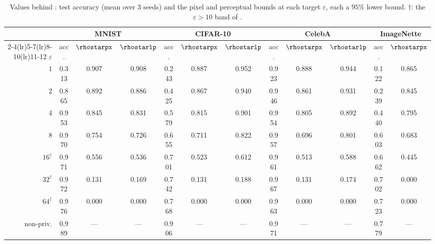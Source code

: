 \begin{table}[htbp]\centering\footnotesize\setlength{\tabcolsep}{3pt}
\begin{tabular}{r ccc ccc ccc cc}
\toprule
 & \multicolumn{3}{c}{MNIST} & \multicolumn{3}{c}{CIFAR-10} & \multicolumn{3}{c}{CelebA} & \multicolumn{2}{c}{ImageNette} \\
\cmidrule(lr){2-4}\cmidrule(lr){5-7}\cmidrule(lr){8-10}\cmidrule(lr){11-12}
$\varepsilon$ & acc. & $\rhostarpx$ & $\rhostarlp$ & acc. & $\rhostarpx$ & $\rhostarlp$ & acc. & $\rhostarpx$ & $\rhostarlp$ & acc. & $\rhostarpx$ \\
\midrule
$1$ & 0.313 & 0.907 & 0.908 & 0.243 & 0.887 & 0.952 & 0.923 & 0.888 & 0.944 & 0.122 & 0.865 \\
$2$ & 0.865 & 0.892 & 0.886 & 0.425 & 0.867 & 0.940 & 0.946 & 0.861 & 0.931 & 0.239 & 0.845 \\
$4$ & 0.953 & 0.845 & 0.831 & 0.579 & 0.815 & 0.901 & 0.954 & 0.805 & 0.892 & 0.440 & 0.795 \\
$8$ & 0.970 & 0.754 & 0.726 & 0.655 & 0.711 & 0.822 & 0.957 & 0.696 & 0.801 & 0.603 & 0.683 \\
$16^{\dagger}$ & 0.971 & 0.556 & 0.536 & 0.701 & 0.523 & 0.612 & 0.961 & 0.513 & 0.588 & 0.662 & 0.445 \\
$32^{\dagger}$ & 0.972 & 0.131 & 0.169 & 0.742 & 0.131 & 0.188 & 0.967 & 0.131 & 0.174 & 0.702 & 0.000 \\
$64^{\dagger}$ & 0.976 & 0.000 & 0.000 & 0.768 & 0.000 & 0.000 & 0.963 & 0.000 & 0.000 & 0.723 & 0.000 \\
\midrule
non-priv. & 0.989 & --- & --- & 0.906 & --- & --- & 0.971 & --- & --- & 0.779 & --- \\
\bottomrule
\end{tabular}
\caption{Values behind : test accuracy (mean over 3 seeds) and the pixel and perceptual bounds at each target $\varepsilon$, each a $95\%$ lower bound. $\dagger$: the $\varepsilon>10$ band of \citet{ponomareva2023dp}.}
\label{tab:spectrum}
\end{table}
